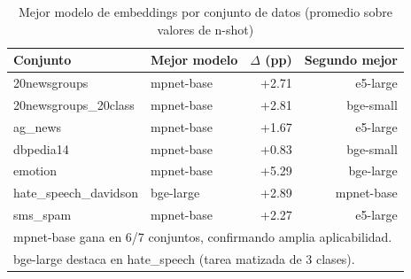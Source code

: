 \begin{table}[htbp]
\centering
\caption{Mejor modelo de embeddings por conjunto de datos (promedio sobre valores de n-shot)}
\label{tab:embedding_dataset_best}
\begin{tabular}{llrr}
\toprule
\textbf{Conjunto} & \textbf{Mejor modelo} & \textbf{$\Delta$ (pp)} & \textbf{Segundo mejor} \\
\midrule
20newsgroups                    & mpnet-base & +2.71 & e5-large \\
20newsgroups\_20class           & mpnet-base & +2.81 & bge-small \\
ag\_news                        & mpnet-base & +1.67 & e5-large \\
dbpedia14                       & mpnet-base & +0.83 & bge-small \\
emotion                         & mpnet-base & +5.29 & bge-large \\
hate\_speech\_davidson          & bge-large  & +2.89 & mpnet-base \\
sms\_spam                       & mpnet-base & +2.27 & e5-large \\
\midrule
\multicolumn{4}{l}{\small mpnet-base gana en 6/7 conjuntos, confirmando amplia aplicabilidad.} \\
\multicolumn{4}{l}{\small bge-large destaca en hate\_speech (tarea matizada de 3 clases).} \\
\bottomrule
\end{tabular}
\end{table}
